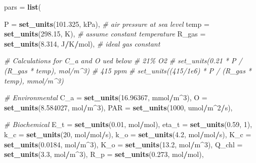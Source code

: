 \documentclass[12pt,halfline,a4paper,]{ouparticle}
\newenvironment{Shaded}{\begin{snugshade}}{\end{snugshade}}
\newcommand{\AttributeTok}[1]{\textcolor[rgb]{0.13,0.29,0.53}{#1}}
\newcommand{\CommentTok}[1]{\textcolor[rgb]{0.56,0.35,0.01}{\textit{#1}}}
\newcommand{\DecValTok}[1]{\textcolor[rgb]{0.00,0.00,0.81}{#1}}
\newcommand{\FloatTok}[1]{\textcolor[rgb]{0.00,0.00,0.81}{#1}}
\newcommand{\FunctionTok}[1]{\textcolor[rgb]{0.13,0.29,0.53}{\textbf{#1}}}
\newcommand{\NormalTok}[1]{#1}
\newcommand{\OtherTok}[1]{\textcolor[rgb]{0.56,0.35,0.01}{#1}}
\newcommand{\SpecialCharTok}[1]{\textcolor[rgb]{0.81,0.36,0.00}{\textbf{#1}}}
\begin{document}
\begin{Shaded}
\begin{Highlighting}[]
\NormalTok{pars }\OtherTok{=} \FunctionTok{list}\NormalTok{(}

    \AttributeTok{P =} \FunctionTok{set\_units}\NormalTok{(}\FloatTok{101.325}\NormalTok{, kPa), }\CommentTok{\# air pressure at sea level}
    \AttributeTok{temp =} \FunctionTok{set\_units}\NormalTok{(}\FloatTok{298.15}\NormalTok{, K), }\CommentTok{\# assume constant temperature}
    \AttributeTok{R\_gas =} \FunctionTok{set\_units}\NormalTok{(}\FloatTok{8.314}\NormalTok{, J}\SpecialCharTok{/}\NormalTok{K}\SpecialCharTok{/}\NormalTok{mol), }\CommentTok{\# ideal gas constant}

    \CommentTok{\# Calculations for C\_a and O ued below}
    \CommentTok{\# 21\% O2}
    \CommentTok{\# set\_units(0.21 * P / (R\_gas * temp), mol/m\^{}3)}
    \CommentTok{\# 415 ppm}
    \CommentTok{\# set\_units((415/1e6) * P / (R\_gas * temp), mmol/m\^{}3)}

    \CommentTok{\# Environmental}
    \AttributeTok{C\_a =} \FunctionTok{set\_units}\NormalTok{(}\FloatTok{16.96367}\NormalTok{, mmol}\SpecialCharTok{/}\NormalTok{m}\SpecialCharTok{\^{}}\DecValTok{3}\NormalTok{),}
    \AttributeTok{O =} \FunctionTok{set\_units}\NormalTok{(}\FloatTok{8.584027}\NormalTok{, mol}\SpecialCharTok{/}\NormalTok{m}\SpecialCharTok{\^{}}\DecValTok{3}\NormalTok{),}
    \AttributeTok{PAR =} \FunctionTok{set\_units}\NormalTok{(}\DecValTok{1000}\NormalTok{, umol}\SpecialCharTok{/}\NormalTok{m}\SpecialCharTok{\^{}}\DecValTok{2}\SpecialCharTok{/}\NormalTok{s),}

    \CommentTok{\# Biochemical}
    \AttributeTok{E\_t =} \FunctionTok{set\_units}\NormalTok{(}\FloatTok{0.01}\NormalTok{, mol}\SpecialCharTok{/}\NormalTok{mol),}
    \AttributeTok{eta\_t =} \FunctionTok{set\_units}\NormalTok{(}\FloatTok{0.59}\NormalTok{, }\DecValTok{1}\NormalTok{),}
    \AttributeTok{k\_c =} \FunctionTok{set\_units}\NormalTok{(}\DecValTok{20}\NormalTok{, mol}\SpecialCharTok{/}\NormalTok{mol}\SpecialCharTok{/}\NormalTok{s),}
    \AttributeTok{k\_o =} \FunctionTok{set\_units}\NormalTok{(}\FloatTok{4.2}\NormalTok{, mol}\SpecialCharTok{/}\NormalTok{mol}\SpecialCharTok{/}\NormalTok{s),}
    \AttributeTok{K\_c =} \FunctionTok{set\_units}\NormalTok{(}\FloatTok{0.0184}\NormalTok{, mol}\SpecialCharTok{/}\NormalTok{m}\SpecialCharTok{\^{}}\DecValTok{3}\NormalTok{),}
    \AttributeTok{K\_o =} \FunctionTok{set\_units}\NormalTok{(}\FloatTok{13.2}\NormalTok{, mol}\SpecialCharTok{/}\NormalTok{m}\SpecialCharTok{\^{}}\DecValTok{3}\NormalTok{),}
    \AttributeTok{Q\_chl =} \FunctionTok{set\_units}\NormalTok{(}\FloatTok{3.3}\NormalTok{, mol}\SpecialCharTok{/}\NormalTok{m}\SpecialCharTok{\^{}}\DecValTok{3}\NormalTok{),}
    \AttributeTok{R\_p =} \FunctionTok{set\_units}\NormalTok{(}\FloatTok{0.273}\NormalTok{, mol}\SpecialCharTok{/}\NormalTok{mol),}


\end{Highlighting}
\end{Shaded}
\end{document}
